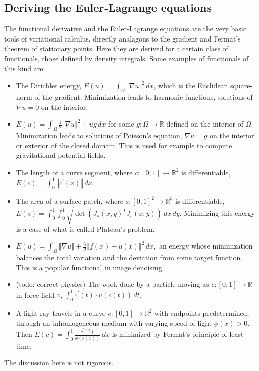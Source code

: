 \documentclass{article}
\newcommand{\norm}[1]{\left\Vert#1\right\Vert}
\begin{document}
\subsection{Deriving the Euler-Lagrange equations} %
The functional derivative and the Euler-Lagrange equations are the very basic tools of variational calculus,
directly analagous to the gradient and Fermat's theorem of stationary points. Here they are derived for a certain
class of functionals, those defined by density integrals. Some examples of functionals of this kind are:
\begin{itemize}
\item
    The Dirichlet energy, $E(u) = \int_\Omega \norm{\nabla u}^2\,dx$, which is the Euclidean square-norm of the gradient.
    Minimization leads to harmonic functions, solutions of $\nabla u = 0$ on the interior.
\item
    $E(u) = \int_\Omega \frac{1}{2}\norm{\nabla u}^2 + ug\,dx$ for some $g:\Omega\rightarrow\mathbb{R}$ defined on the interior of $\Omega$.
    Minimization leads to solutions of Poisson's equation, $\nabla u = g$ on the interior or exterior of the closed domain. This is used
    for example to compute gravitational potential fields.
\item
    The length of a curve segment, where $c:[0,1]\rightarrow \mathbb{R}^2$ is differentiable, $E(c) = \int_0^1 \norm{c^\prime(x)}\,dx$.
\item
    The area of a surface patch, where $s:[0,1]^2\rightarrow \mathbb{R}^3$ is differentiable, $E(s) = \int_0^1\int_0^1 \sqrt{\det(J_s(x,y)^T J_s(x,y))}\,dx\,dy$.
    Minimizing this energy is a case of what is called Plateau's problem.
\item
    $E(u) = \int_\Omega \norm{\nabla u} + \frac{\lambda}{2} \norm{f(x) - u(x)}^2\,dx,$
    an energy whose minimization balances the total variation and the deviation from some target function.
    This is a popular functional in image denoising.
\item
    (todo: correct physics) The work done by a particle moving as $c:[0,1]\rightarrow \mathbb{R}$ in force field $v$,
    $\int_0^1 c^\prime(t)\cdot v(c(t))\,dt$.
\item
    A light ray travels in a curve $c:[0,1]\rightarrow \mathbb{R}^2$ with endpoints predetermined, through an inhomogeneous medium with varying speed-of-light $\phi(x) > 0$.
    Then $E(c) = \int_0^1 \frac{c^\prime(t)}{\phi(c(x))}\,dx$ is minimized by Fermat's principle of least time.
\end{itemize}
The discussion here is not rigorous.
\end{document}
